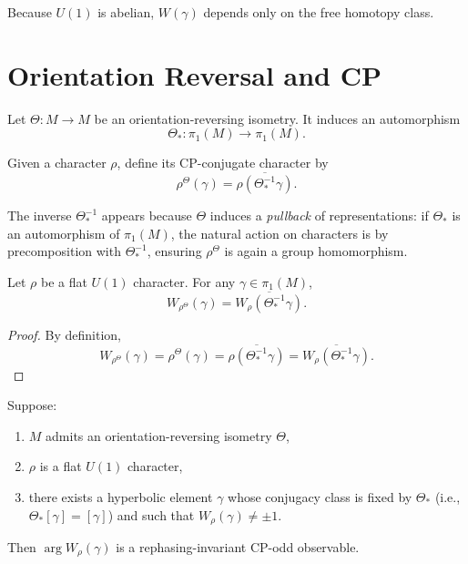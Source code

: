 \documentclass[12pt]{article}
\begin{document}
Because $U(1)$ is abelian, $W(\gamma)$ depends only on the
free homotopy class.

\section{Orientation Reversal and CP}

Let $\Theta : M \to M$ be an orientation-reversing isometry.
It induces an automorphism
\[
\Theta_* : \pi_1(M) \to \pi_1(M).
\]

\begin{definition}
Given a character $\rho$, define its CP-conjugate character by
\[
\rho^{\Theta}(\gamma)
=
\overline{\rho(\Theta_*^{-1}\gamma)}.
\]
\end{definition}

\begin{remark}
The inverse $\Theta_*^{-1}$ appears because $\Theta$ induces a
\emph{pullback} of representations: if $\Theta_*$ is an automorphism
of $\pi_1(M)$, the natural action on characters is by precomposition
with $\Theta_*^{-1}$, ensuring $\rho^\Theta$ is again a group homomorphism.
\end{remark}

\begin{lemma}
Let $\rho$ be a flat $U(1)$ character.
For any $\gamma \in \pi_1(M)$,
\[
W_{\rho^{\Theta}}(\gamma)
=
\overline{W_{\rho}(\Theta_*^{-1}\gamma)}.
\]
\end{lemma}

\begin{proof}
By definition,
\[
W_{\rho^{\Theta}}(\gamma)
=
\rho^{\Theta}(\gamma)
=
\overline{\rho(\Theta_*^{-1}\gamma)}
=
\overline{W_{\rho}(\Theta_*^{-1}\gamma)}.
\]
\end{proof}

\begin{theorem}
Suppose:
\begin{enumerate}
\item $M$ admits an orientation-reversing isometry $\Theta$,
\item $\rho$ is a flat $U(1)$ character,
\item there exists a hyperbolic element $\gamma$ whose conjugacy class
is fixed by $\Theta_*$ (i.e., $\Theta_*[\gamma] = [\gamma]$) and such that
$W_\rho(\gamma) \neq \pm 1$.
\end{enumerate}
Then $\arg W_\rho(\gamma)$ is a rephasing-invariant
CP-odd observable.
\end{theorem}
\end{document}
